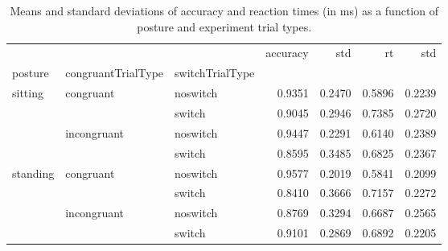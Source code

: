 \begin{table}
\centering
\caption{Means and standard deviations of accuracy and reaction times (in ms) as a function of posture and experiment trial types.}
\label{table-task-switching-replication-reaction-time}
\begin{tabular}{lllrrrr}
\toprule
         &             &        & accuracy &    std &     rt &    std \\
posture & congruantTrialType & switchTrialType &          &        &        &        \\
\midrule
sitting & congruant & noswitch &   0.9351 & 0.2470 & 0.5896 & 0.2239 \\
         &             & switch &   0.9045 & 0.2946 & 0.7385 & 0.2720 \\
         & incongruant & noswitch &   0.9447 & 0.2291 & 0.6140 & 0.2389 \\
         &             & switch &   0.8595 & 0.3485 & 0.6825 & 0.2367 \\
standing & congruant & noswitch &   0.9577 & 0.2019 & 0.5841 & 0.2099 \\
         &             & switch &   0.8410 & 0.3666 & 0.7157 & 0.2272 \\
         & incongruant & noswitch &   0.8769 & 0.3294 & 0.6687 & 0.2565 \\
         &             & switch &   0.9101 & 0.2869 & 0.6892 & 0.2205 \\
\bottomrule
\end{tabular}
\end{table}
